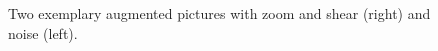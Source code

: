 \begin{figure}[H]
    \centering
    \begin{subfigure}{0.48\textwidth}
        \centering
    \end{subfigure}
    \hfill
    \begin{subfigure}{0.48\textwidth}
        \centering
    \end{subfigure}
    \caption{Two exemplary augmented pictures with zoom and shear (right) and noise (left).}
    \label{fig:comp2}
\end{figure}
